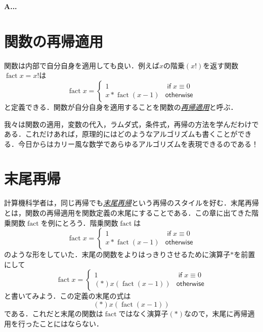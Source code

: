 \documentclass[a5paper,draft]{jsbook}
\newenvironment{leader}{\begingroup\bf}{\endgroup}
\newcommand{\keyword}[1]{{\underline{\emph{#1}}}}
\newcommand{\mathSpecialFunction}[1]{\operatorname{\mathrm{#1}}}
\newcommand{\mathFactorial}{\mathSpecialFunction{fact}}
\newcommand{\mathKeyword}[1]{\operatorname{\textsf{#1}}}
\newcommand{\mathIf}{\mathKeyword{if}}
\newcommand{\mathOtherwise}{\mathKeyword{otherwise}}
\begin{document}
\begin{leader}
A...
\end{leader}


\section{関数の再帰適用}

関数は内部で自分自身を適用しても良い．例えば$x$の階乗$(x!)$を返す関数$\mathFactorial x=x!$は
\begin{equation}
\mathFactorial x=\begin{cases}
1&\mathIf x\equiv0\\
x*\mathFactorial(x-1)&\mathOtherwise
\end{cases}
\end{equation}
と定義できる．関数が自分自身を適用することを関数の\keyword{再帰適用}と呼ぶ．

我々は関数の適用，変数の代入，ラムダ式，条件式，再帰の方法を学んだわけである．これだけあれば，原理的にはどのようなアルゴリズムも書くことができる．今日からはカリー風な数学であらゆるアルゴリズムを表現できるのである！

\section{末尾再帰}

計算機科学者は，同じ再帰でも\keyword{末尾再帰}という再帰のスタイルを好む．末尾再帰とは，関数の再帰適用を関数定義の末尾にすることである．この章に出てきた階乗関数$\mathFactorial$を例にとろう．階乗関数$\mathFactorial$は
\begin{equation}
\mathFactorial x=\begin{cases}
1&\mathIf x\equiv0\\
x*\mathFactorial(x-1)&\mathOtherwise
\end{cases}
\end{equation}
のような形をしていた．末尾の関数をよりはっきりさせるために演算子$*$を前置にして
\begin{equation}
\mathFactorial x=\begin{cases}
1&\mathIf x\equiv0\\
(*)x(\mathFactorial(x-1))&\mathOtherwise
\end{cases}
\end{equation}
と書いてみよう．この定義の末尾の式は
\begin{equation}
(*)x(\mathFactorial(x-1))
\end{equation}
である．これだと末尾の関数は$\mathFactorial$ではなく演算子$(*)$なので，末尾に再帰適用を行ったことにはならない．
\end{document}
